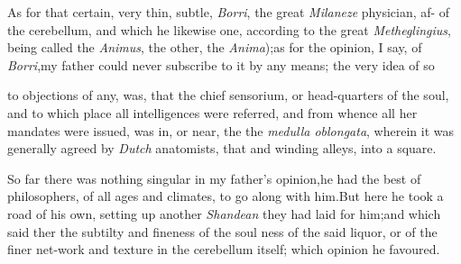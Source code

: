 \documentclass{article}
\begin{document}
As for that certain, very thin, subtle, 
\textit{Borri}, the great \textit{Milaneze} physician, af-\break
{}
of the cerebellum, and which he likewise
one, according to the great \textit{Metheglingius},
being called the \textit{Animus}, the other, the
\textit{Anima});\tsk as for the opinion, I say, of
\textit{Borri},\tsk my father could never subscribe to it by any
means; the very idea of so 

\noindent
{}
to objections of any, was, that the chief sensorium, or
head-quarters of the soul, and to which place all intelligences
were referred, and from whence all her mandates were issued,\tsk
was in, or near, the\break
{}
the \textit{medulla oblongata}, wherein it was ge\-nerally agreed
by \textit{Dutch} anatomists, that
 and
winding alleys, into a square.

So far there was nothing singular in my father’s
opinion,\tsk he had the best of philosophers, of all ages and
climates, to go along with him.\tsk But here he took a\break
road of his own, setting up another \textit{Shan\-dean}  they had laid for him;\tsk and which
said 
ther the subtilty and
fineness of the soul  ness of
the said liquor, or of the finer net-work and texture in the
cerebellum itself; which opinion he favoured.
\end{document}
